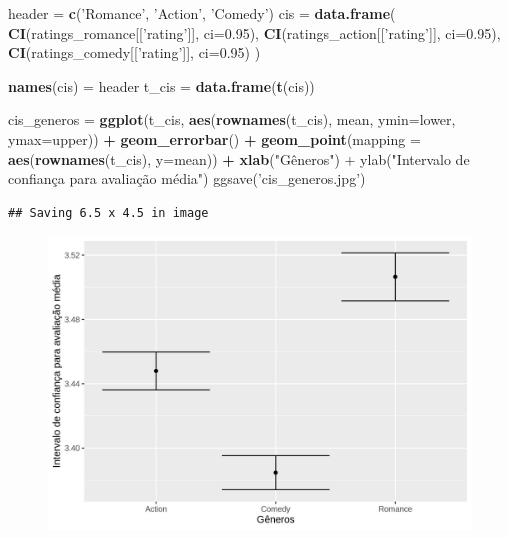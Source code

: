 \documentclass[]{article}
\newenvironment{Shaded}{\begin{snugshade}}{\end{snugshade}}
\newcommand{\KeywordTok}[1]{\textcolor[rgb]{0.13,0.29,0.53}{\textbf{#1}}}
\newcommand{\DataTypeTok}[1]{\textcolor[rgb]{0.13,0.29,0.53}{#1}}
\newcommand{\FloatTok}[1]{\textcolor[rgb]{0.00,0.00,0.81}{#1}}
\newcommand{\StringTok}[1]{\textcolor[rgb]{0.31,0.60,0.02}{#1}}
\newcommand{\OperatorTok}[1]{\textcolor[rgb]{0.81,0.36,0.00}{\textbf{#1}}}
\newcommand{\NormalTok}[1]{#1}
\begin{document}
\begin{Shaded}
\begin{Highlighting}[]
\NormalTok{  header =}\StringTok{ }\KeywordTok{c}\NormalTok{(}\StringTok{'Romance'}\NormalTok{, }\StringTok{'Action'}\NormalTok{, }\StringTok{'Comedy'}\NormalTok{)}
\NormalTok{  cis =}\StringTok{  }\KeywordTok{data.frame}\NormalTok{(}
            \KeywordTok{CI}\NormalTok{(ratings_romance[[}\StringTok{'rating'}\NormalTok{]], }\DataTypeTok{ci=}\FloatTok{0.95}\NormalTok{),}
            \KeywordTok{CI}\NormalTok{(ratings_action[[}\StringTok{'rating'}\NormalTok{]], }\DataTypeTok{ci=}\FloatTok{0.95}\NormalTok{), }
            \KeywordTok{CI}\NormalTok{(ratings_comedy[[}\StringTok{'rating'}\NormalTok{]], }\DataTypeTok{ci=}\FloatTok{0.95}\NormalTok{)}
\NormalTok{          )  }
  
  \KeywordTok{names}\NormalTok{(cis) =}\StringTok{ }\NormalTok{header}
\NormalTok{  t_cis =}\StringTok{ }\KeywordTok{data.frame}\NormalTok{(}\KeywordTok{t}\NormalTok{(cis))}


\NormalTok{  cis_generos =}\StringTok{ }\KeywordTok{ggplot}\NormalTok{(t_cis, }\KeywordTok{aes}\NormalTok{(}\KeywordTok{rownames}\NormalTok{(t_cis), mean, }\DataTypeTok{ymin=}\NormalTok{lower, }\DataTypeTok{ymax=}\NormalTok{upper)) }\OperatorTok{+}
\StringTok{    }\KeywordTok{geom_errorbar}\NormalTok{() }\OperatorTok{+}
\StringTok{    }\KeywordTok{geom_point}\NormalTok{(}\DataTypeTok{mapping =} \KeywordTok{aes}\NormalTok{(}\KeywordTok{rownames}\NormalTok{(t_cis), }\DataTypeTok{y=}\NormalTok{mean)) }\OperatorTok{+}
\StringTok{    }\KeywordTok{xlab}\NormalTok{(}\StringTok{"Gêneros") + ylab("}\NormalTok{Intervalo de confiança para avaliação média}\StringTok{")}
\StringTok{  ggsave('cis_generos.jpg')}
\end{Highlighting}
\end{Shaded}

\begin{verbatim}
## Saving 6.5 x 4.5 in image
\end{verbatim}

\begin{figure}
\centering
\includegraphics{./cis_generos.jpg}
\caption{}
\end{figure}
\end{document}
